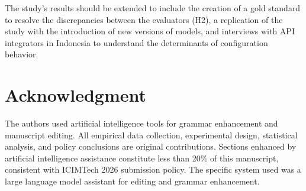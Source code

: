 \documentclass[conference]{IEEEtran}
\begin{document}
The study's results should be extended to include the creation of a gold standard to resolve the discrepancies between the evaluators (H2), a replication of the study with the introduction of new versions of models, and interviews with API integrators in Indonesia to understand the determinants of configuration behavior.

\section*{Acknowledgment}

The authors used artificial intelligence tools for grammar enhancement and
manuscript editing. All empirical data collection, experimental design,
statistical analysis, and policy conclusions are original contributions. Sections
enhanced by artificial intelligence assistance constitute less than 20\% of this
manuscript, consistent with ICIMTech 2026 submission policy. The specific system
used was a large language model assistant for editing and grammar enhancement.
\end{document}
